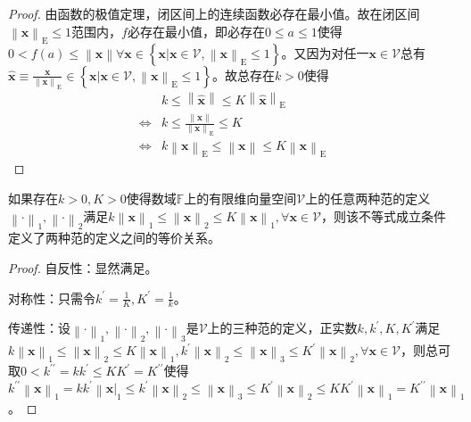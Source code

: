\documentclass[main.tex]{subfiles}
\begin{document}
\begin{proof}
由函数的极值定理，闭区间上的连续函数必存在最小值。故在闭区间$\left\|\mathbf{x}\right\|_\mathrm{E}\leq 1$范围内，$f$必存在最小值，即必存在$0\leq a\leq 1$使得$0<f\left(a\right)\leq\left\|\mathbf{x}\right\|\forall\mathbf{x}\in\left\{\mathbf{x}|\mathbf{x}\in\mathcal{V},\left\|\mathbf{x}\right\|_\mathrm{E}\leq1\right\}$。又因为对任一$\mathbf{x}\in\mathcal{V}$总有$\mathbf{\hat{x}}\equiv\frac{\mathbf{x}}{\left\|\mathbf{x}\right\|_\mathrm{E}}\in\left\{\mathbf{x}|\mathbf{x}\in\mathcal{V},\left\|\mathbf{x}\right\|_\mathrm{E}\leq1\right\}$。故总存在$k>0$使得
\begin{align*}
    &k\leq\left\|\mathbf{\hat{x}}\right\|\leq K\left\|\mathbf{\hat{x}}\right\|_\mathrm{E}\\
    \Leftrightarrow&k\leq\frac{\left\|\mathbf{x}\right\|}{\left\|\mathbf{x}\right\|_\mathrm{E}}\leq K\\
    \Leftrightarrow&k\left\|\mathbf{x}\right\|_\mathrm{E}\leq\left\|\mathbf{x}\right\|\leq K\left\|\mathbf{x}\right\|_\mathrm{E}
\end{align*}
\end{proof}

\begin{lemma}
如果存在$k>0,K>0$使得数域$\mathbb{F}$上的有限维向量空间$\mathcal{V}$上的任意两种范的定义$\left\|\cdot\right\|_1,\left\|\cdot\right\|_2$满足$k\left\|\mathbf{x}\right\|_1\leq\left\|\mathbf{x}\right\|_2\leq K\left\|\mathbf{x}\right\|_1,\forall\mathbf{x}\in\mathcal{V}$，则该不等式成立条件定义了两种范的定义之间的等价关系。
\end{lemma}
\begin{proof}
自反性：显然满足。

对称性：只需令$k^\prime=\frac{1}{K},K^\prime=\frac{1}{k}$。

传递性：设$\left\|\cdot\right\|_1,\left\|\cdot\right\|_2,\left\|\cdot\right\|_3$是$\mathcal{V}$上的三种范的定义，正实数$k,k^\prime,K,K^\prime$满足$k\left\|\mathbf{x}\right\|_1\leq\left\|\mathbf{x}\right\|_2\leq K\left\|\mathbf{x}\right\|_1,k^\prime\left\|\mathbf{x}\right\|_2\leq\left\|\mathbf{x}\right\|_3\leq K^\prime\left\|\mathbf{x}\right\|_2,\forall\mathbf{x}\in\mathcal{V}$，则总可取$0<k^{\prime\prime}=kk^\prime\leq KK^\prime=K^{\prime\prime}$使得$k^{\prime\prime}\left\|\mathbf{x}\right\|_1=kk^\prime\left\|\mathbf{x}\right|_1\leq k^\prime\left\|\mathbf{x}\right\|_2\leq\left\|\mathbf{x}\right\|_3\leq K^\prime\left\|\mathbf{x}\right\|_2\leq KK^\prime\left\|\mathbf{x}\right\|_1=K^{\prime\prime}\left\|\mathbf{x}\right\|_1$。
\end{proof}
\end{document}
